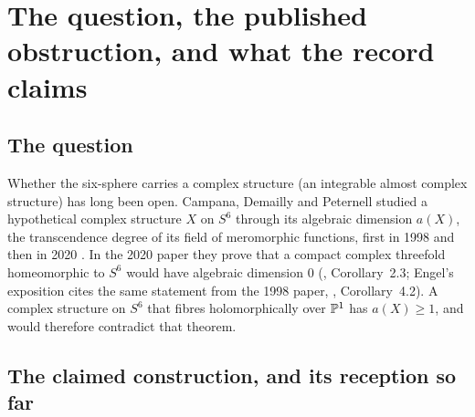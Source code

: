 \section{The question, the published obstruction, and what the record claims}\label{sec:problem}

\subsection{The question}

Whether the six-sphere carries a complex structure (an integrable almost complex structure) has long been open. Campana, Demailly and Peternell studied a hypothetical complex structure $X$ on $S^6$ through its algebraic dimension $a(X)$, the transcendence degree of its field of meromorphic functions, first in 1998 \cite{CDP98} and then in 2020 \cite{CDP20}. In the 2020 paper they prove that a compact complex threefold homeomorphic to $S^6$ would have algebraic dimension $0$ (\cite{CDP20}, Corollary~2.3; Engel's exposition cites the same statement from the 1998 paper, \cite{CDP98}, Corollary~4.2). A complex structure on $S^6$ that fibres holomorphically over $\mathbb{P}^1$ has $a(X)\ge1$, and would therefore contradict that theorem.

\subsection{The claimed construction, and its reception so far}

